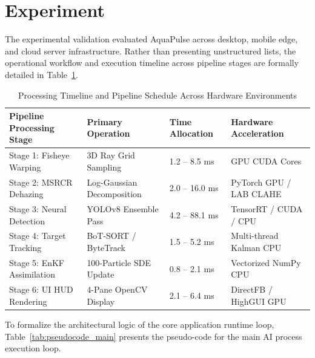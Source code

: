 \documentclass[11pt,a4paper]{article}
\newcommand{\refblue}[1]{\ref{#1}}
\begin{document}
\section{Experiment}
The experimental validation evaluated AquaPulse across desktop, mobile edge, and cloud server infrastructure. Rather than presenting unstructured lists, the operational workflow and execution timeline across pipeline stages are formally detailed in Table~\refblue{tab:experiment_timeline}.

\begin{table}[htbp]
\caption{Processing Timeline and Pipeline Schedule Across Hardware Environments}
\label{tab:experiment_timeline}
\centering
\small
\begin{tabular}{p{3.8cm} p{3.2cm} p{3.0cm} p{4.2cm}}
\toprule
\textbf{Pipeline Processing Stage} & \textbf{Primary Operation} & \textbf{Time Allocation} & \textbf{Hardware Acceleration} \\
\midrule
Stage 1: Fisheye Warping & 3D Ray Grid Sampling & 1.2 -- 8.5 ms & GPU CUDA Cores \\
Stage 2: MSRCR Dehazing & Log-Gaussian Decomposition & 2.0 -- 16.0 ms & PyTorch GPU / LAB CLAHE \\
Stage 3: Neural Detection & YOLOv8 Ensemble Pass & 4.2 -- 88.1 ms & TensorRT / CUDA / CPU \\
Stage 4: Target Tracking & BoT-SORT / ByteTrack & 1.5 -- 5.2 ms & Multi-thread Kalman CPU \\
Stage 5: EnKF Assimilation & 100-Particle SDE Update & 0.8 -- 2.1 ms & Vectorized NumPy CPU \\
Stage 6: UI HUD Rendering & 4-Pane OpenCV Display & 2.1 -- 6.4 ms & DirectFB / HighGUI GPU \\
\bottomrule
\end{tabular}
\end{table}

To formalize the architectural logic of the core application runtime loop, Table~\refblue{tab:pseudocode_main} presents the pseudo-code for the main AI process execution loop.
\end{document}
